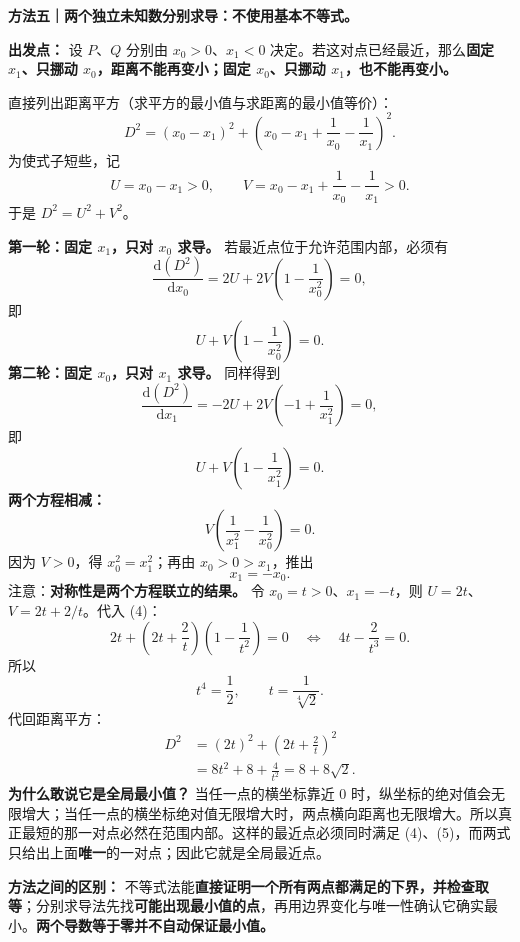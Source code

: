 \clearpage
\begin{proofbox}
\textbf{方法五｜两个独立未知数分别求导：不使用基本不等式。}

\textbf{出发点：} 设 $P$、$Q$ 分别由 $x_0>0$、$x_1<0$ 决定。若这对点已经最近，那么\textbf{固定 $x_1$、只挪动 $x_0$，距离不能再变小；固定 $x_0$、只挪动 $x_1$，也不能再变小。}

直接列出距离平方（求平方的最小值与求距离的最小值等价）：
\[
D^2=(x_0-x_1)^2+\left(x_0-x_1+\frac1{x_0}-\frac1{x_1}\right)^2.
\]
为使式子短些，记
\[
U=x_0-x_1>0,\qquad
V=x_0-x_1+\frac1{x_0}-\frac1{x_1}>0.
\]
于是 $D^2=U^2+V^2$。

\textbf{第一轮：固定 $x_1$，只对 $x_0$ 求导。} 若最近点位于允许范围内部，必须有
\[
\frac{\mathrm d(D^2)}{\mathrm d x_0}
=2U+2V\left(1-\frac1{x_0^2}\right)=0,
\]
即
\[
\boxed{U+V\left(1-\frac1{x_0^2}\right)=0.}\tag{4}
\]
\textbf{第二轮：固定 $x_0$，只对 $x_1$ 求导。} 同样得到
\[
\frac{\mathrm d(D^2)}{\mathrm d x_1}
=-2U+2V\left(-1+\frac1{x_1^2}\right)=0,
\]
即
\[
\boxed{U+V\left(1-\frac1{x_1^2}\right)=0.}\tag{5}
\]
\textbf{两个方程相减：}
\[
V\left(\frac1{x_1^2}-\frac1{x_0^2}\right)=0.
\]
因为 $V>0$，得 $x_0^2=x_1^2$；再由 $x_0>0>x_1$，推出
\[
\boxed{x_1=-x_0.}
\]
注意：\textbf{对称性是两个方程联立的结果。} 令 $x_0=t>0$、$x_1=-t$，则 $U=2t$、$V=2t+2/t$。代入 (4)：
\[
2t+\left(2t+\frac2t\right)\left(1-\frac1{t^2}\right)=0
\quad\Longleftrightarrow\quad 4t-\frac2{t^3}=0.
\]
所以
\[
\boxed{t^4=\frac12},\qquad t=\frac1{\sqrt[4]2}.
\]
代回距离平方：
\[
\begin{aligned}
D^2&=(2t)^2+\left(2t+\frac2t\right)^2\\
&=8t^2+8+\frac4{t^2}=8+8\sqrt2.
\end{aligned}
\]
\textbf{为什么敢说它是全局最小值？} 当任一点的横坐标靠近 $0$ 时，纵坐标的绝对值会无限增大；当任一点的横坐标绝对值无限增大时，两点横向距离也无限增大。所以真正最短的那一对点必然在范围内部。这样的最近点必须同时满足 (4)、(5)，而两式只给出上面\textbf{唯一}的一对点；因此它就是全局最近点。

\textbf{方法之间的区别：} 不等式法能\textbf{直接证明一个所有两点都满足的下界，并检查取等}；分别求导法先找\textbf{可能出现最小值的点}，再用边界变化与唯一性确认它确实最小。\textbf{两个导数等于零并不自动保证最小值。}
\end{proofbox}

